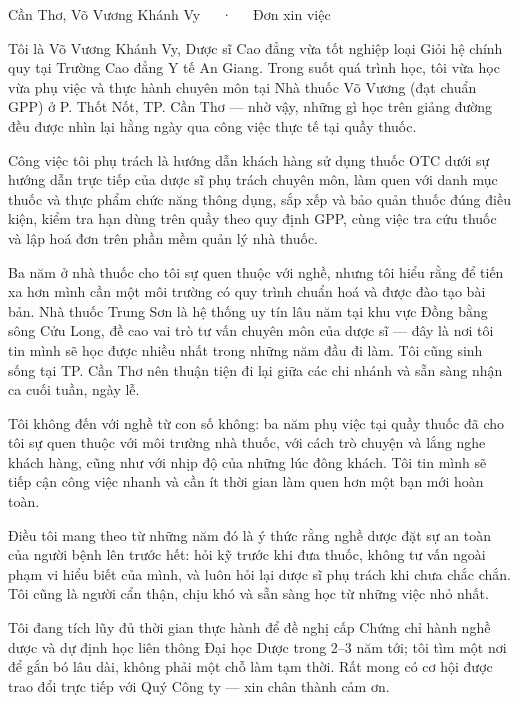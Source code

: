 \documentclass[11pt, a4paper]{awesome-cv}
\makeatletter
\renewcommand*{\makeletterclosing}{%
  \vspace{2mm}
  \lettertextstyle{\@letterclosing} \\\\
  \letternamestyle{\@firstname\ \@lastname}
  \ifthenelse{\isundefined{\@letterenclosure}}
    {\\}
    {%
      \\\\
      \letterenclosurestyle{\@letterenclname: \@letterenclosure}%
    }
}
\makeatother
\begin{document}
\makecvheader[R]

\makecvfooter
  {Cần Thơ, \ngayhomnay}
  {Võ Vương Khánh Vy~~~·~~~Đơn xin việc}
  {}

\makelettertitle

\begin{cvletter}

Tôi là Võ Vương Khánh Vy, Dược sĩ Cao đẳng vừa tốt nghiệp loại Giỏi hệ chính quy tại
Trường Cao đẳng Y tế An Giang. Trong suốt quá trình học, tôi vừa học vừa phụ việc và
thực hành chuyên môn tại Nhà thuốc Võ Vương (đạt chuẩn GPP) ở P. Thốt Nốt, TP. Cần Thơ
--- nhờ vậy, những gì học trên giảng đường đều được nhìn lại hằng ngày qua công việc
thực tế tại quầy thuốc.

Công việc tôi phụ trách là hướng dẫn khách hàng sử dụng thuốc OTC dưới sự hướng dẫn
trực tiếp của dược sĩ phụ trách chuyên môn, làm quen với danh mục thuốc và thực phẩm
chức năng thông dụng, sắp xếp và bảo quản thuốc đúng điều kiện, kiểm tra hạn dùng trên
quầy theo quy định GPP, cùng việc tra cứu thuốc và lập hoá đơn trên phần mềm quản lý
nhà thuốc.

Ba năm ở nhà thuốc cho tôi sự quen thuộc với nghề, nhưng tôi hiểu rằng để tiến xa hơn
mình cần một môi trường có quy trình chuẩn hoá và được đào tạo bài bản. Nhà thuốc
Trung Sơn là hệ thống uy tín lâu năm tại khu vực Đồng bằng sông Cửu Long, đề cao vai trò
tư vấn chuyên môn của dược sĩ --- đây là nơi tôi tin mình sẽ học được nhiều nhất trong
những năm đầu đi làm. Tôi cũng sinh sống tại TP. Cần Thơ nên thuận tiện đi lại giữa các
chi nhánh và sẵn sàng nhận ca cuối tuần, ngày lễ.

Tôi không đến với nghề từ con số không: ba năm phụ việc tại quầy thuốc đã cho tôi sự
quen thuộc với môi trường nhà thuốc, với cách trò chuyện và lắng nghe khách hàng, cũng
như với nhịp độ của những lúc đông khách. Tôi tin mình sẽ tiếp cận công việc nhanh và
cần ít thời gian làm quen hơn một bạn mới hoàn toàn.

Điều tôi mang theo từ những năm đó là ý thức rằng nghề dược đặt sự an toàn của người
bệnh lên trước hết: hỏi kỹ trước khi đưa thuốc, không tư vấn ngoài phạm vi hiểu biết
của mình, và luôn hỏi lại dược sĩ phụ trách khi chưa chắc chắn. Tôi cũng là người cẩn
thận, chịu khó và sẵn sàng học từ những việc nhỏ nhất.

Tôi đang tích lũy đủ thời gian thực hành để đề nghị cấp Chứng chỉ hành nghề dược và dự
định học liên thông Đại học Dược trong 2--3 năm tới; tôi tìm một nơi để gắn bó lâu dài,
không phải một chỗ làm tạm thời. Rất mong có cơ hội được trao đổi trực tiếp với Quý Công
ty --- xin chân thành cảm ơn.

\end{cvletter}

\makeletterclosing
\end{document}
